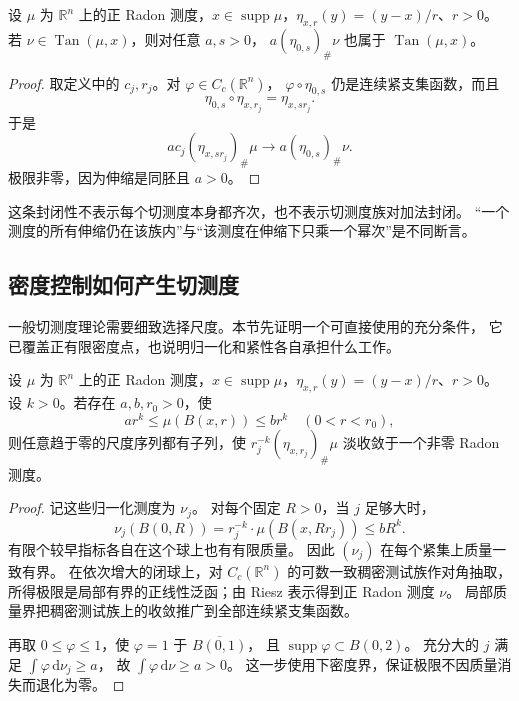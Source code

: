 \begin{proposition}\label{b1:prop:app-d-tangent-scaling}
设 \(\mu\) 为 \(\mathbb R^n\) 上的正 Radon 测度，\(x\in\operatorname{supp}\mu\)，\(\eta_{x,r}(y)=(y-x)/r\)、\(r>0\)。若 \(\nu\in\operatorname{Tan}(\mu,x)\)，则对任意 \(a,s>0\)，
\(a(\eta_{0,s})_\#\nu\) 也属于 \(\operatorname{Tan}(\mu,x)\)。
\end{proposition}
\begin{proof}
取定义中的 \(c_j,r_j\)。对 \(\varphi\in C_c(\mathbb R^n)\)，
\(\varphi\circ\eta_{0,s}\) 仍是连续紧支集函数，而且
\[
 \eta_{0,s}\circ\eta_{x,r_j}=\eta_{x,sr_j}.
\]
于是
\[
 ac_j(\eta_{x,sr_j})_\#\mu
   \longrightarrow a(\eta_{0,s})_\#\nu.
\]
极限非零，因为伸缩是同胚且 \(a>0\)。
\end{proof}

这条封闭性不表示每个切测度本身都齐次，也不表示切测度族对加法封闭。
“一个测度的所有伸缩仍在该族内”与“该测度在伸缩下只乘一个幂次”是不同断言。

\subsection{密度控制如何产生切测度}
\label{b1:subsec:D10102}

一般切测度理论需要细致选择尺度。本节先证明一个可直接使用的充分条件，
它已覆盖正有限密度点，也说明归一化和紧性各自承担什么工作。

\begin{proposition}\label{b1:prop:app-d-tangent-existence-density}
设 \(\mu\) 为 \(\mathbb R^n\) 上的正 Radon 测度，\(x\in\operatorname{supp}\mu\)，\(\eta_{x,r}(y)=(y-x)/r\)、\(r>0\)。设 \(k>0\)。若存在 \(a,b,r_0>0\)，使
\[
 ar^k\leq\mu(B(x,r))\leq br^k
 \quad(0<r<r_0),
\]
则任意趋于零的尺度序列都有子列，使
\(r_j^{-k}(\eta_{x,r_j})_\#\mu\) 淡收敛于一个非零 Radon 测度。
\end{proposition}
\begin{proof}
记这些归一化测度为 \(\nu_j\)。
对每个固定 \(R>0\)，当 \(j\) 足够大时，
\[
 \nu_j(B(0,R))=r_j^{-k}\cdot\mu(B(x,Rr_j))\leq bR^k.
\]
有限个较早指标各自在这个球上也有有限质量。
因此 \((\nu_j)\) 在每个紧集上质量一致有界。
在依次增大的闭球上，对 \(C_c(\mathbb R^n)\) 的可数一致稠密测试族作对角抽取，
所得极限是局部有界的正线性泛函；由 Riesz 表示得到正 Radon 测度 \(\nu\)。
局部质量界把稠密测试族上的收敛推广到全部连续紧支集函数。

再取 \(0\leq\varphi\leq1\)，使 \(\varphi=1\) 于 \(\overline{B(0,1)}\)，
且 \(\operatorname{supp}\varphi\subset B(0,2)\)。
充分大的 \(j\) 满足 \(\int\varphi\,\mathrm{d}\nu_j\geq a\)，
故 \(\int\varphi\,\mathrm{d}\nu\geq a>0\)。
这一步使用下密度界，保证极限不因质量消失而退化为零。
\end{proof}


